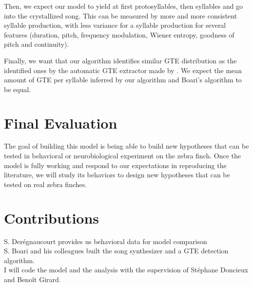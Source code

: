 \documentclass[a4paper]{article}
\begin{document}
Then, we expect our model to yield at first protosyllables, then syllables and
go into the crystallized song. This can be measured by more and more consistent
syllable production, with less variance for a syllable production for several
features (duration, pitch, frequency modulation, Wiener entropy, goodness of
pitch and continuity).

Finally, we want that our algorithm identifies similar GTE distribution as the
identified ones by the automatic GTE extractor made by
\textcite{boari_automatic_2015}. We expect the mean amount of GTE per syllable
inferred by our algorithm and Boari's algorithm to be equal.

\section*{Final Evaluation}

The goal of building this model is being able to build new hypotheses that can
be tested in behavioral or neurobiological experiment on the zebra finch. Once
the model is fully working and respond to our expectations in reproducing the
literature, we will study its behaviors to design new hypotheses that can
be tested on real zebra finches.

\section*{Contributions}
S. Derégnaucourt provides us behavioral data for model comparison\\
S. Boari and his colleagues built the song synthesizer and a GTE detection
algorithm.\\
I will code the model and the analysis with the supervision of Stéphane Doncieux
and Benoît Girard.\\

\clearpage%
\printbibliography{}
\end{document}
